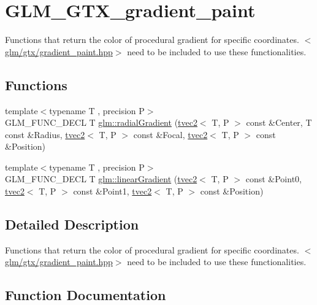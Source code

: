 \hypertarget{group__gtx__gradient__paint}{}\section{G\+L\+M\+\_\+\+G\+T\+X\+\_\+gradient\+\_\+paint}
\label{group__gtx__gradient__paint}


Functions that return the color of procedural gradient for specific coordinates. $<$\hyperlink{gradient__paint_8hpp}{glm/gtx/gradient\+\_\+paint.\+hpp}$>$ need to be included to use these functionalities.  


\subsection*{Functions}
\begin{DoxyCompactItemize}
\item 
{\footnotesize template$<$typename T , precision P$>$ }\\G\+L\+M\+\_\+\+F\+U\+N\+C\+\_\+\+D\+E\+CL T \hyperlink{group__gtx__gradient__paint_ga166d43d567a4cf150579a92f69b0dc9f}{glm\+::radial\+Gradient} (\hyperlink{structglm_1_1tvec2}{tvec2}$<$ T, P $>$ const \&Center, T const \&Radius, \hyperlink{structglm_1_1tvec2}{tvec2}$<$ T, P $>$ const \&Focal, \hyperlink{structglm_1_1tvec2}{tvec2}$<$ T, P $>$ const \&Position)
\item 
{\footnotesize template$<$typename T , precision P$>$ }\\G\+L\+M\+\_\+\+F\+U\+N\+C\+\_\+\+D\+E\+CL T \hyperlink{group__gtx__gradient__paint_gacde26d5e0c4a1856467bded9dfad9040}{glm\+::linear\+Gradient} (\hyperlink{structglm_1_1tvec2}{tvec2}$<$ T, P $>$ const \&Point0, \hyperlink{structglm_1_1tvec2}{tvec2}$<$ T, P $>$ const \&Point1, \hyperlink{structglm_1_1tvec2}{tvec2}$<$ T, P $>$ const \&Position)
\end{DoxyCompactItemize}


\subsection{Detailed Description}
Functions that return the color of procedural gradient for specific coordinates. $<$\hyperlink{gradient__paint_8hpp}{glm/gtx/gradient\+\_\+paint.\+hpp}$>$ need to be included to use these functionalities. 



\subsection{Function Documentation}
\mbox{\label{group__gtx__gradient__paint_gacde26d5e0c4a1856467bded9dfad9040}} 
